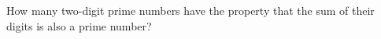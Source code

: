 How many two-digit prime numbers have the property that the sum of their digits is also a prime number?
